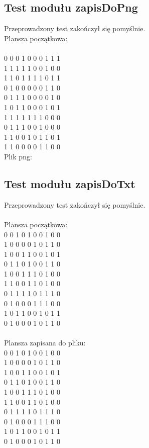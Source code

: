 \documentclass[10pt, oneside]{article}
\begin{document}
\subsection{Test modułu zapisDoPng}
Przeprowadzony test zakończył się pomyślnie. \\
Plansza początkowa:\\
\\
0 0 0 1 0 0 0 1 1 1 \\
1 1 1 1 1 0 0 1 0 0 \\
1 1 0 1 1 1 1 0 1 1 \\
0 1 0 0 0 0 0 1 1 0 \\
0 1 1 1 0 0 0 0 1 0 \\
1 0 1 1 0 0 0 1 0 1 \\
1 1 1 1 1 1 1 0 0 0 \\
0 1 1 1 0 0 1 0 0 0 \\
1 1 0 0 1 0 1 1 0 1 \\
1 1 0 0 0 0 1 1 0 0 \\


Plik png:
 


\subsection{Test modułu zapisDoTxt}
Przeprowadzony test zakończył się pomyślnie. \\
\\
Plansza początkowa:\\
0 0 1 0 1 0 0 1 0 0\\
1 0 0 0 0 1 0 1 1 0\\
1 0 0 1 1 0 0 1 0 1\\
0 1 1 0 1 0 0 1 1 0\\
1 0 0 1 1 1 0 1 0 0\\
1 1 0 0 1 1 0 1 0 0\\
0 1 1 1 1 0 1 1 1 0\\
0 1 0 0 0 1 1 1 0 0\\
1 0 1 1 0 0 1 0 1 1\\
0 1 0 0 0 1 0 1 1 0\\
\\
Plansza zapisana do pliku:\\
0 0 1 0 1 0 0 1 0 0\\
1 0 0 0 0 1 0 1 1 0\\
1 0 0 1 1 0 0 1 0 1\\
0 1 1 0 1 0 0 1 1 0\\
1 0 0 1 1 1 0 1 0 0\\
1 1 0 0 1 1 0 1 0 0\\
0 1 1 1 1 0 1 1 1 0\\
0 1 0 0 0 1 1 1 0 0\\
1 0 1 1 0 0 1 0 1 1\\
0 1 0 0 0 1 0 1 1 0\\
\end{document}
